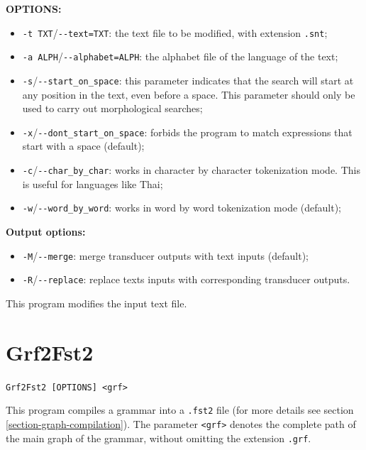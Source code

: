 \bigskip
\noindent \textbf{OPTIONS:}
\begin{itemize}
  \item \verb+-t TXT+/\verb+--text=TXT+: the text file to be
  modified, with extension \verb+.snt+;
  
  \item \verb+-a ALPH+/\verb+--alphabet=ALPH+: the alphabet file of the language of the
  text;

  \item \verb+-s+/\verb+--start_on_space+: this parameter indicates that the
  search will start at any position in the text, even before a space. This 
  parameter should only be used to carry out morphological searches;
  
  \item \verb+-x+/\verb+--dont_start_on_space+: forbids the program to match
  expressions that start with a space (default);
  
  \item \verb+-c+/\verb+--char_by_char+: works in character by character
  tokenization mode. This is useful for languages like Thai;
  
  \item \verb+-w+/\verb+--word_by_word+: works in word by word
  tokenization mode (default);
\end{itemize}

\bigskip
\noindent \textbf{Output options:}
\begin{itemize}
  \item \verb+-M+/\verb+--merge+: merge transducer outputs with text inputs
  (default);
  \item \verb+-R+/\verb+--replace+: replace texts inputs with corresponding
  transducer outputs.
\end{itemize}

\bigskip
\noindent This program modifies the input text file.







\section{Grf2Fst2}
\verb+Grf2Fst2 [OPTIONS] <grf>+

\bigskip
\noindent {}
This program compiles a grammar into a \verb+.fst2+ file (for more details see
section \ref{section-graph-compilation}). The parameter \verb+<grf>+ 
denotes the complete path of the main graph of the grammar, without omitting the
extension \verb+.grf+.

